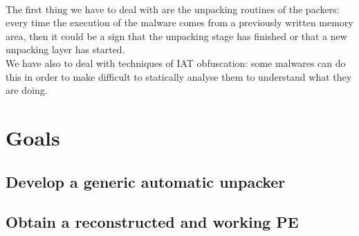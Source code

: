 \paragraph{}
The first thing we have to deal with are the unpacking routines of the packers: every time the execution of the malware comes from a previously written memory area, then it could be a sign that the unpacking stage has finished or that a new unpacking layer has started.\\
We have also to deal with techniques of IAT obfuscation: some malwares can do this in order to make difficult to statically analyse them to understand what they are doing.

\section{Goals}
\subsection{Develop a generic automatic unpacker}
\subsection{Obtain a reconstructed and working PE}